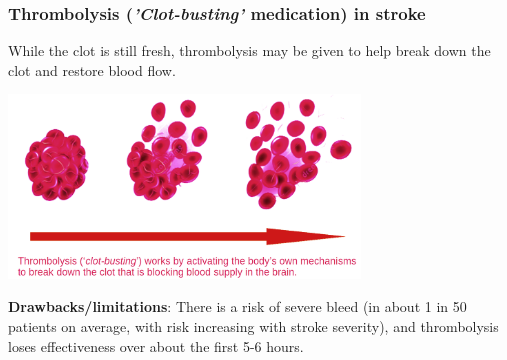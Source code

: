 \begin{frame}
\frametitle{Thrombolysis (\emph{'Clot-busting'} medication) in stroke}

While the clot is still fresh, thrombolysis may be given to help break down the clot and restore blood flow.

\vspace{3mm}

\begin{center}
\includegraphics[width=0.70\textwidth]{./images/thrombolysis_mechanism}
\end{center}

\textbf{Drawbacks/limitations}: There is a risk of severe bleed (in about 1 in 50 patients on average, with risk increasing with stroke severity), and thrombolysis loses effectiveness over about the first 5-6 hours.

\end{frame}